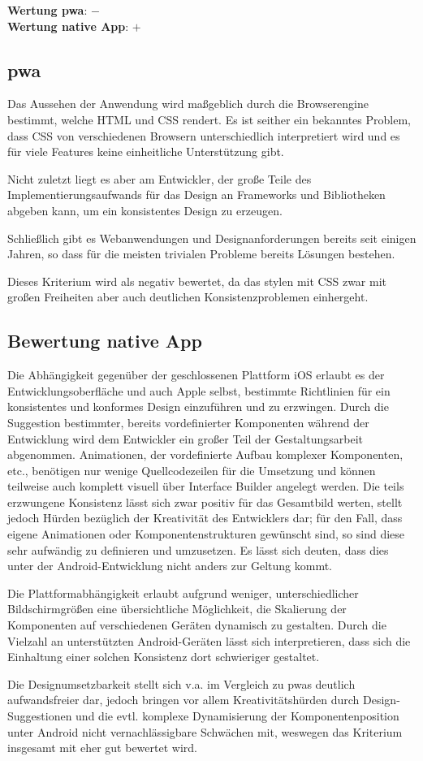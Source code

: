 \textbf{Wertung \ac{pwa}}: $-$\\
\textbf{Wertung native App}: $+$ \\

\subsection{\ac{pwa}}
Das Aussehen der Anwendung wird maßgeblich durch die Browserengine bestimmt, welche HTML und CSS rendert. Es ist seither ein bekanntes Problem, dass CSS von verschiedenen Browsern unterschiedlich interpretiert wird und es für viele Features keine einheitliche Unterstützung gibt.

Nicht zuletzt liegt es aber am Entwickler, der große Teile des Implementierungsaufwands für das Design an Frameworks und Bibliotheken abgeben kann, um ein konsistentes Design zu erzeugen. 

Schließlich gibt es Webanwendungen und Designanforderungen bereits seit einigen Jahren, so dass für die meisten trivialen Probleme bereits Lösungen bestehen.

Dieses Kriterium wird als negativ bewertet, da das stylen mit CSS zwar mit großen Freiheiten aber auch deutlichen Konsistenzproblemen einhergeht.

\subsection{Bewertung native App}
Die Abhängigkeit gegenüber der geschlossenen Plattform iOS erlaubt es der Entwicklungsoberfläche und auch Apple selbst, bestimmte Richtlinien für ein konsistentes und konformes Design einzuführen und zu erzwingen. Durch die Suggestion bestimmter, bereits vordefinierter Komponenten während der Entwicklung wird dem Entwickler ein großer Teil der Gestaltungsarbeit abgenommen. Animationen, der vordefinierte Aufbau komplexer Komponenten, etc., benötigen nur wenige Quellcodezeilen für die Umsetzung und können teilweise auch komplett visuell über Interface Builder angelegt werden. Die teils erzwungene Konsistenz lässt sich zwar positiv für das Gesamtbild werten, stellt jedoch Hürden bezüglich der Kreativität des Entwicklers dar; für den Fall, dass eigene Animationen oder Komponentenstrukturen gewünscht sind, so sind diese sehr aufwändig zu definieren und umzusetzen. Es lässt sich deuten, dass dies unter der Android-Entwicklung nicht anders zur Geltung kommt.

Die Plattformabhängigkeit erlaubt aufgrund weniger, unterschiedlicher Bildschirmgrößen eine übersichtliche Möglichkeit, die Skalierung der Komponenten auf verschiedenen Geräten dynamisch zu gestalten. Durch die Vielzahl an unterstützten Android-Geräten lässt sich interpretieren, dass sich die Einhaltung einer solchen Konsistenz dort schwieriger gestaltet.

Die Designumsetzbarkeit stellt sich v.a. im Vergleich zu \acp{pwa} deutlich aufwandsfreier dar, jedoch bringen vor allem Kreativitätshürden durch Design-Suggestionen und die evtl. komplexe Dynamisierung der Komponentenposition unter Android nicht vernachlässigbare Schwächen mit, weswegen das Kriterium insgesamt mit eher gut bewertet wird.